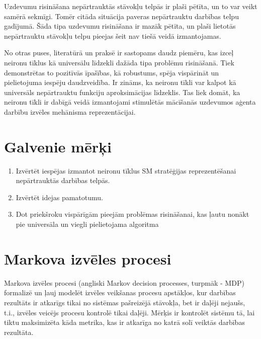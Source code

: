 \documentclass[a0,landscape]{a0poster}
\numberwithin{equation}{section}
\theoremstyle{definition}
\theoremstyle{plain}
\begin{document}
\begin{multicols}{5}
Uzdevumu risināšana nepārtrauktās stāvokļu telpās ir plaši pētīta, un to var veikt samērā sekmīgi.
Tomēr citāda situācija paveras nepārtrauktu darbības telpu gadījumā.
Šāda tipa uzdevumu risināšana ir mazāk pētīta, un plaši lietotās nepārtrauktu stāvokļu telpu pieejas šeit nav tiešā veidā izmantojamas.

No otras puses, literatūrā un praksē ir sastopams daudz piemēru, kas izceļ neironu tīklus kā universālu līdzekli dažāda tipa problēmu risināšanā.
Tiek demonstrētas to pozitīvās īpašības, kā robustums, spēja vispārināt un pielietojuma iespēju daudzveidība.
Ir zināms, ka neironu tīkli var kalpot kā universāls nepārtrauktu funkciju aproksimācijas līdzeklis.
Tas liek domāt, ka neironu tīkli ir dabīgā veidā izmantojami stimulētās mācīšanās uzdevumos aģenta darbību izvēles mehānisma reprezentācijai.



\color{DarkSlateGray} %

\section*{Galvenie mērķi}
\begin{enumerate}
	\item Izvērtēt iespējas izmantot neironu tīklus SM stratēģijas reprezentēšanai nepārtrauktās darbības telpās.
	\item Izvērtēt idejas pamatotumu.
	\item Dot priekšroku vispārīgām pieejām problēmas risināšanai, kas ļautu nonākt pie universāla un viegli pielietojama algoritma
\end{enumerate}


\section*{Markova izvēles procesi}

Markova izvēles procesi (angliski Markov decision processes, turpmāk - MDP) formalizē un ļauj modelēt izvēles veikšanas procesu apstākļos, kur darbības rezultāts ir atkarīgs tikai no sistēmas pašreizējā stāvokļa, bet ir daļēji nejaušs, t.i., izvēles veicējs procesu kontrolē tikai daļēji.
Mērķis ir kontrolēt sistēmu tā, lai tiktu maksimizēta kāda metrika, kas ir atkarīga no katrā solī veiktās darbības rezultāta.


\end{multicols}
\end{document}
